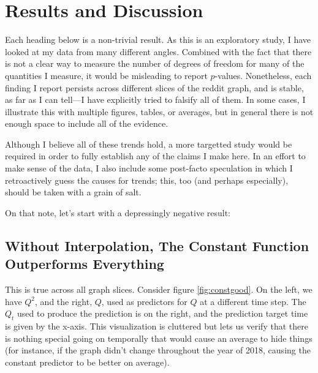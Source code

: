 \documentclass{article}
\theoremstyle{definition}
\begin{document}
	
	\section{Results and Discussion}
	Each heading below is a non-trivial result.  As this is an exploratory study, I have looked at my data from many different angles. Combined with the fact that there is not a clear way to measure the number of degrees of freedom for many of the quantities I measure, it would be misleading to report $p$-values. Nonetheless, each finding I report persists across different slices of the reddit graph, and is stable, as far as I can tell---I have explicitly tried to falsify all of them. In some cases, I illustrate this with multiple figures, tables, or averages, but in general there is not enough space to include all of the evidence. 
	
	Although I believe all of these trends hold, a more targetted study would be required in order to fully establish any of the claims I make here. In an effort to make sense of the data, I also include some post-facto speculation in which I retroactively guess the causes for trends; this, too (and perhaps especially), should be taken with a grain of salt. 
	
	On that note, let's start with a depressingly negative result:	
	
	\subsection{Without Interpolation, The Constant Function Outperforms Everything}\label{sec:godconst}
	This is true across all graph slices. Consider figure \ref{fig:constgood}. On the left, we have $Q^2$, and the right, $Q$, used as predictors for $Q$ at a different time step. The $Q_t$ used to produce the prediction is on the right, and the prediction target time is given by the x-axis. This visualization is cluttered but lets us verify that there is nothing special going on temporally that would cause an average to hide things (for instance, if the graph didn't change throughout the year of 2018, causing the constant predictor to be better on average).
	
\end{document}
